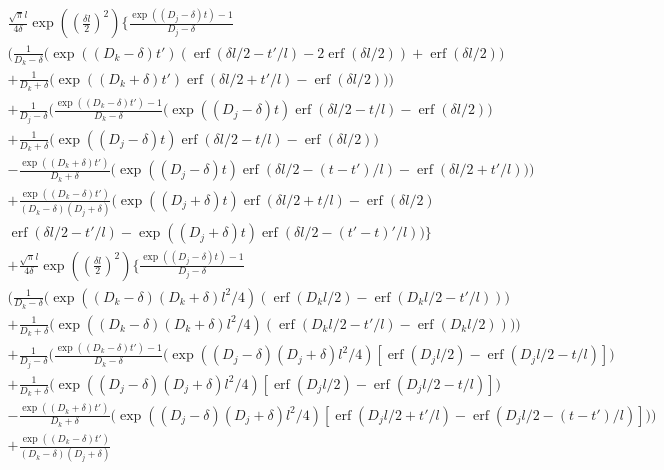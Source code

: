 \documentclass[a4paper]{article}
\newcommand{\erf}{\operatorname{erf}}
\begin{document}
\begin{multline}
  \frac{\sqrt{\pi}l}{4\delta}\exp\left(\left(\frac{\delta l}{2}\right)^2\right)
  \bigg\{
  \frac{\exp((D_j-\delta) t) - 1}{D_j-\delta} \\
  \bigg(
  \frac{1}{D_k-\delta}
  \bigg(
  \exp((D_k-\delta)t') (\erf(\delta l/2 - t'/l) - 2\erf(\delta l/2))
  + \erf(\delta l/2) \bigg) \\
  + \frac{1}{D_k+\delta}
  \bigg(
  \exp((D_k+\delta)t') \erf(\delta l/2 + t'/l) - \erf(\delta l/2) \bigg)
  \bigg) \\
  +
  \frac{1}{D_j - \delta} \bigg(
  \frac{\exp((D_k-\delta) t') - 1}{D_k-\delta}
  \bigg(\exp((D_j-\delta) t) \erf(\delta l/2 - t/l) - \erf(\delta l/2)
  \bigg) \\
  +
  \frac{1}{D_k+\delta}
  \bigg(\exp((D_j-\delta) t) \erf(\delta l/2 - t/l) - \erf(\delta l/2)
  \bigg) \\
  - \frac{\exp((D_k+\delta)t')}{D_k+\delta} \bigg(
  \exp((D_j-\delta) t) \erf(\delta l/2 - (t-t')/l) - \erf(\delta l/2 +
  t'/l) 
  \bigg)
  \bigg) \\
  +
  \frac{\exp((D_k-\delta) t')}{(D_k-\delta)(D_j+\delta)}
  \bigg(
  \exp((D_j + \delta) t) \erf(\delta l/2 + t/l) - \erf(\delta l / 2) \\
  \erf(\delta l / 2 - t'/l) - 
  \exp((D_j + \delta) t) \erf(\delta l / 2 - (t'-t)'/l)
  \bigg)
  \bigg\} \\
  +
  \frac{\sqrt{\pi}l}{4\delta}\exp\left(\left(\frac{\delta l}{2}\right)^2\right)
  \bigg\{
  \frac{\exp((D_j-\delta) t) - 1}{D_j-\delta} \\
  \bigg(
  \frac{1}{D_k-\delta}
  \bigg(
  \exp((D_k-\delta)(D_k+\delta)l^2/4)
  (\erf(D_k l/2) - \erf(D_k l/2  - t'/l) )
  \bigg) \\
  + \frac{1}{D_k+\delta}
  \bigg(
  \exp((D_k-\delta)(D_k+\delta)l^2/4)
  (\erf(D_k l/2  - t'/l) - \erf(D_k l/2))
  \bigg)  
  \bigg) \\
  +
  \frac{1}{D_j - \delta} \bigg(
  \frac{\exp((D_k-\delta) t') - 1}{D_k-\delta}
  \bigg(
  \exp((D_j - \delta)(D_j + \delta)l^2/4)[\erf(D_j l/2) - \erf(D_j
  l/2 - t/l) ]\bigg) \\
  +
  \frac{1}{D_k+\delta}
  \bigg(
  \exp((D_j - \delta)(D_j + \delta)l^2/4)[\erf(D_j l/2) - \erf(D_j
  l/2 - t/l) ]\bigg)
  \\
  - \frac{\exp((D_k+\delta)t')}{D_k+\delta} \bigg(
  \exp((D_j - \delta)(D_j + \delta)l^2/4)[\erf(D_j l/2 + t'/l) - \erf(D_j
  l/2 - (t-t')/l) ]
  \bigg)
  \bigg) \\
  +
  \frac{\exp((D_k-\delta) t')}{(D_k-\delta)(D_j+\delta)}

\end{multline}
\end{document}

